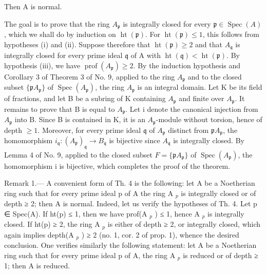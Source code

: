 Then A is normal.

The goal is to prove that the ring \(A_{\mathfrak{p}}\) is integrally closed for every \(\mathfrak{p} \in \operatorname{Spec}(A)\), which we shall do by induction on \(\operatorname{ht}(\mathfrak{p})\). For \(\operatorname{ht}(\mathfrak{p}) \leqslant 1\), this follows from hypotheses (i) and (ii). Suppose therefore that \(\operatorname{ht}(\mathfrak{p}) \geqslant 2\) and that \(A_{\mathfrak{q}}\) is integrally closed for every prime ideal \(\mathfrak{q}\) of A with \(\operatorname{ht}(\mathfrak{q}) < \operatorname{ht}(\mathfrak{p})\). By hypothesis (iii), we have \(\operatorname{prof}(A_{\mathfrak{p}}) \geqslant 2\). By the induction hypothesis and Corollary 3 of Theorem 3 of No. 9, applied to the ring \(A_{\mathfrak{p}}\) and to the closed subset \(\{\mathfrak{p}A_{\mathfrak{p}}\}\) of \(\operatorname{Spec}(A_{\mathfrak{p}})\), the ring \(A_{\mathfrak{p}}\) is an integral domain. Let K be its field of fractions, and let B be a subring of K containing \(A_{\mathfrak{p}}\) and finite over \(A_{\mathfrak{p}}\). It remains to prove that B is equal to \(A_{\mathfrak{p}}\). Let i denote the canonical injection from \(A_{\mathfrak{p}}\) into B. Since B is contained in K, it is an \(A_{\mathfrak{p}}\)-module without torsion, hence of depth \(\geqslant 1\). Moreover, for every prime ideal \(\mathfrak{q}\) of \(A_{\mathfrak{p}}\) distinct from \(\mathfrak{p}A_{\mathfrak{p}}\), the homomorphism \(i_{\mathfrak{q}}: (A_{\mathfrak{p}})_{\mathfrak{q}} \to B_{\mathfrak{q}}\) is bijective since \(A_{\mathfrak{q}}\) is integrally closed. By Lemma 4 of No. 9, applied to the closed subset \(F = \{\mathfrak{p}A_{\mathfrak{p}}\}\) of \(\operatorname{Spec}(A_{\mathfrak{p}})\), the homomorphism i is bijective, which completes the proof of the theorem.

Remark 1.--- A convenient form of Th. 4 is the following: let A be a Noetherian ring such that for every prime ideal p of A the ring A \(_{p}\) is integrally closed or of depth ≥ 2; then A is normal. Indeed, let us verify the hypotheses of Th. 4. Let p ∈ Spec(A). If ht(p) ≤ 1, then we have prof(A \(_{p}\) ) ≤ 1, hence A \(_{p}\) is integrally closed. If ht(p) ≥ 2, the ring A \(_{p}\) is either of depth ≥ 2, or integrally closed, which again implies depth(A \(_{p}\) ) ≥ 2 (no. 1, cor. 2 of prop. 1), whence the desired conclusion. One verifies similarly the following statement: let A be a Noetherian ring such that for every prime ideal p of A, the ring A \(_{p}\) is reduced or of depth ≥ 1; then A is reduced.

